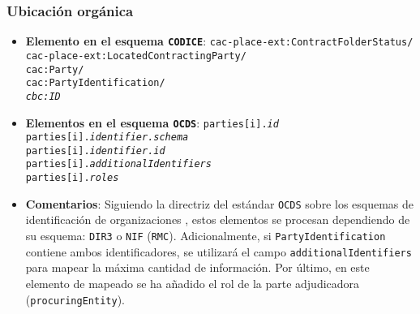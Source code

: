         \subsubsection{Ubicación orgánica} \label{subsec:UbicacionOrganica}
            \begin{itemize}
                \item \textbf{Elemento en el esquema \texttt{CODICE}}:
                    \tabto{7.6cm} \texttt{cac-place-ext:ContractFolderStatus/} \\
                    \tabto{7.6cm} \texttt{cac-place-ext:LocatedContractingParty/} \\
                    \tabto{7.6cm} \texttt{cac:Party/} \\
                    \tabto{7.6cm} \texttt{cac:PartyIdentification/} \\
                    \tabto{7.6cm} \texttt{\textit{cbc:ID}}
                \item \textbf{Elementos en el esquema \texttt{OCDS}}:
                    \tabto{7.6cm} \texttt{parties[i].\textit{id}} \\
                    \tabto{7.6cm} \texttt{parties[i].\textit{identifier.schema}} \\
                    \tabto{7.6cm} \texttt{parties[i].\textit{identifier.id}} \\
                    \tabto{7.6cm} \texttt{parties[i].\textit{additionalIdentifiers}} \\
                    \tabto{7.6cm} \texttt{parties[i].\textit{roles}}
                \item \textbf{Comentarios}: Siguiendo la directriz del estándar \texttt{OCDS} sobre los esquemas de identificación de organizaciones \cite{CR13}, estos elementos se procesan dependiendo de su esquema: \texttt{DIR3} \cite{CR14} o \texttt{NIF} \cite{CR15} (\texttt{RMC}). Adicionalmente, si \texttt{PartyIdentification} contiene ambos identificadores, se utilizará el campo \texttt{additionalIdentifiers} para mapear la máxima cantidad de información. Por último, en este elemento de mapeado se ha añadido el rol de la parte adjudicadora (\texttt{procuringEntity}).
            \end{itemize}
        
